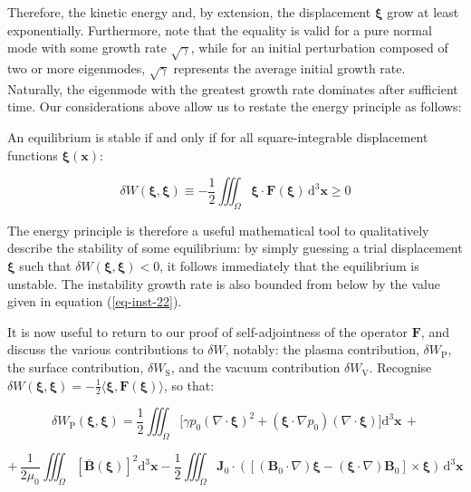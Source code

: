 Therefore, the kinetic energy and, by extension, the displacement $\boldsymbol{\xi}$ grow at least exponentially. Furthermore, note that the equality is valid for a pure normal mode with some growth rate $\sqrt{\gamma}$, while for an initial perturbation composed of two or more eigenmodes, $\sqrt{\gamma}$ represents the average initial growth rate. Naturally, the eigenmode with the greatest growth rate dominates after sufficient time. Our considerations above allow us to restate the energy principle as follows:

\quad An equilibrium is stable if and only if for all square-integrable displacement functions $\boldsymbol{\xi}(\mathbf{x})$:

\begin{equation}
    \delta W(\boldsymbol{\xi},\boldsymbol{\xi})\equiv-\frac{1}{2}\iiint_\Omega\boldsymbol{\xi}\cdot\mathbf{F}(\boldsymbol{\xi})\,\mathrm{d}^3\mathbf{x}\geq0
\end{equation}

The energy principle is therefore a useful mathematical tool to qualitatively describe the stability of some equilibrium: by simply guessing a trial displacement $\boldsymbol{\xi}$ such that $\delta W(\boldsymbol{\xi},\boldsymbol{\xi})<0$, it follows immediately that the equilibrium is unstable. The instability growth rate is also bounded from below by the value given in equation (\ref{eq-inst-22}).

\quad It is now useful to return to our proof of self-adjointness of the operator $\mathbf{F}$, and discuss the various contributions to $\delta W$, notably: the plasma contribution, $\delta W_\text{P}$, the surface contribution, $\delta W_\text{S}$, and the vacuum contribution $\delta W_\text{V}$. Recognise $\delta W(\boldsymbol{\xi}, \boldsymbol{\xi})=-\frac{1}{2}\langle\boldsymbol{\xi},\mathbf{F}(\boldsymbol{\xi})\rangle$, so that:

\begin{equation*}
    \delta W_\text{P}(\boldsymbol{\xi},\boldsymbol{\xi})=\frac{1}{2}\iiint_{\Omega}\Big[\gamma p_0(\nabla\cdot\boldsymbol{\xi})^2+(\boldsymbol{\xi}\cdot\nabla p_0)(\nabla\cdot\boldsymbol{\xi})\Big]\mathrm{d}^3\mathbf{x}\,+
\end{equation*}

\begin{equation}
    +\,\frac{1}{2\mu_0}\iiint_\Omega\left[\bar{\mathbf{B}}(\boldsymbol{\xi})\right]^2\mathrm{d}^3\mathbf{x}-\frac{1}{2}\iiint_\Omega\mathbf{J}_0\cdot\left(\left[(\mathbf{B}_0\cdot\nabla)\boldsymbol{\xi}-(\boldsymbol{\xi}\cdot\nabla)\mathbf{B}_0\right]\times\boldsymbol{\xi}\right)\,\mathrm{d}^3\mathbf{x}
\end{equation}

